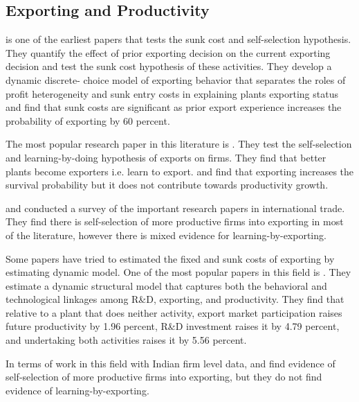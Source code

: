 \documentclass[12pt]{article}
\begin{document}
\subsection*{Exporting and Productivity}

\textcite{roberts1997decision} is one of the earliest papers that
tests the sunk cost and self-selection hypothesis. They quantify the effect of prior exporting
decision on the current exporting decision and test the sunk cost
hypothesis of these activities.  They  develop a dynamic discrete-
 choice model of exporting behavior that separates the roles of profit heterogeneity
 and sunk entry costs in explaining plants exporting status and find
 that sunk costs are significant as prior export experience increases
 the probability of exporting by 60 percent.  

The most popular research paper in this literature is
\textcite{bernard1999exceptional}. They test the self-selection and
 learning-by-doing hypothesis of exports on firms. They find that better
 plants become exporters i.e. learn to export. and find that exporting
 increases the survival probability but it does not contribute towards
 productivity growth.  

\textcite{wagner2007exports} and \textcite{wagner2012international}
conducted a survey of the important research papers in international
trade. They find  there is self-selection of more productive
firms into exporting in most of the literature, however there is mixed evidence for
learning-by-exporting.  


Some papers have tried to estimated the fixed and sunk costs of
exporting by estimating dynamic model. One of the most popular papers
in this field is \textcite{aw2011}. They estimate a dynamic structural model that captures both the behavioral
and technological linkages among R\&D, exporting, and
productivity. They find that relative to a
plant that does neither activity, export market participation raises future productivity
by 1.96 percent, R\&D investment raises it by 4.79 percent, and undertaking both
activities raises it by 5.56 percent. 

In terms of work in this field with Indian firm level data,
\textcite{haidar2012trade} and \textcite{gupta2018exporting} find evidence of
self-selection of more productive firms into exporting, but they do
not find evidence of learning-by-exporting. 

\end{document}
